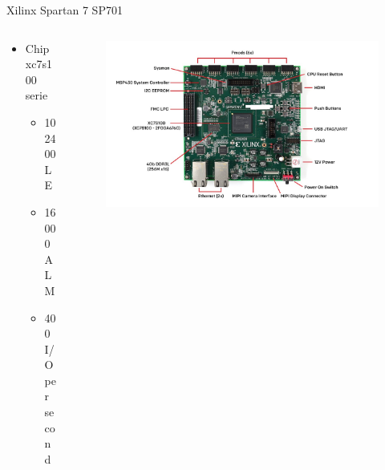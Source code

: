 \begin{frame}{Xilinx Spartan 7 SP701}
	\begin{columns}
    \begin{column}{0.5\textwidth} %
	    \begin{itemize}
	    \item Chip xc7s100 serie %
	    \begin{itemize}
	    	\item 102400 LE %
	   	 \item 16000 ALM %
	    	\item 400 I/O  per second %
	    \end{itemize}
	\end{itemize}
\end{column}
\begin{column}{.5\textwidth} %

\begin{figure}[!ht]
    \includegraphics[width=1.3\linewidth]{images/spartan7.jpg}
\end{figure}
\end{column}
\end{columns}
\end{frame}
